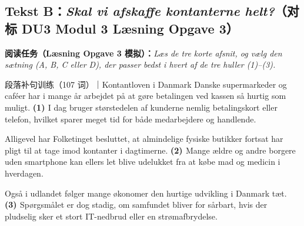 \subsection*{Tekst B：\textit{Skal vi afskaffe kontanterne helt?}（对标 DU3 Modul 3 Læsning Opgave 3）}

\textbf{阅读任务（Læsning Opgave 3 模拟）：}\textit{Læs de tre korte afsnit, og vælg den sætning (A, B, C eller D), der passer bedst i hvert af de tre huller (1)--(3).}

\vspace{0.3em}
\begin{emailbox}{段落补句训练（107 词）｜Kontantloven i Danmark}
Danske supermarkeder og caféer har i mange år arbejdet på at gøre betalingen ved kassen så hurtig som muligt. \textbf{(1) \underline{\hspace{2.0cm}}} I dag bruger størstedelen af kunderne nemlig betalingskort eller telefon, hvilket sparer meget tid for både medarbejdere og handlende.

Alligevel har Folketinget besluttet, at almindelige fysiske butikker fortsat har pligt til at tage imod kontanter i dagtimerne. \textbf{(2) \underline{\hspace{2.0cm}}} Mange ældre og andre borgere uden smartphone kan ellers let blive udelukket fra at købe mad og medicin i hverdagen.

Også i udlandet følger mange økonomer den hurtige udvikling i Danmark tæt. \textbf{(3) \underline{\hspace{2.0cm}}} Spørgsmålet er dog stadig, om samfundet bliver for sårbart, hvis der pludselig sker et stort IT-nedbrud eller en strømafbrydelse.
\end{emailbox}

